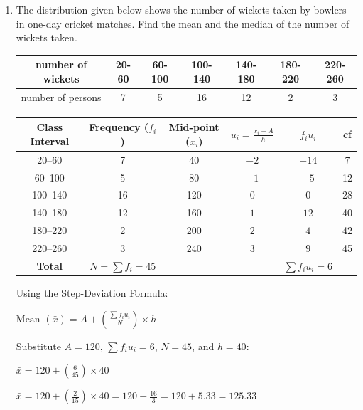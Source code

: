 \begin{enumerate}[label=\thesubsection.\arabic*, ref=\thesubsection.\theenumi]
	$Y(x)= x^2-4x+8  \implies R(x)= 10x-33$
	
	$P(x)- R(x)= 2x^3-3x^2 -4x+40  $ is divisible by $ x^2-4x+8$

	
	\item The distribution given below shows the number of wickets taken by bowlers in one-day cricket matches. Find the mean and the median of the number of wickets taken.
	
		\begin{tabular}{c|c|c|c|c|c|c}
		
		\hline
		number of wickets & 20-60 & 60-100 & 100-140 & 140-180 & 180-220 & 220-260 \\ 
		\hline 
		
		number of persons & 7 & 5&16&12&2 &3\\ \hline  
		
		
	\end{tabular}
	
	
	\solution
	
	\begin{center}
		\begin{tabular}{cccccc}
			\hline
			\textbf{Class Interval} & \textbf{Frequency ($f_i$)} & \textbf{Mid-point ($x_i$)} & $u_i = \frac{x_i - A}{h}$ & $f_i u_i$  & cf \\
			\hline
			20--60   & 7  & 40  & $-2$ & $-14$ & 7 \\
			60--100  & 5  & 80  & $-1$ & $-5$ &12 \\
			100--140 & 16 & 120 & $0$  & $0$   & 28\\
			140--180 & 12 & 160 & $1$  & $12$   & 40\\
			180--220 & 2  & 200 & $2$  & $4$   & 42 \\
			220--260 & 3  & 240 & $3$  & $9$  & 45 \\
			\hline
			\textbf{Total} & $N = \sum f_i = 45$ & & & $\sum f_i u_i = 6$  & \\
			\hline
		\end{tabular}
	\end{center}
	
	
	
	Using the Step-Deviation Formula:
	\begin{center}
	$\text{Mean } (\bar{x}) = A + \left( \frac{\sum f_i u_i}{N} \right) \times h$
	\end{center}
	
	Substitute $A = 120$, $\sum f_i u_i = 6$, $N = 45$, and $h = 40$:
	\begin{center}
	$\bar{x} = 120 + \left( \frac{6}{45} \right) \times 40$
	\end{center}
	\begin{center}
	$\bar{x} = 120 + \left( \frac{2}{15} \right) \times 40 = 120 + \frac{16}{3} = 120 + 5.33 = 125.33$
	\end{center}
	

\end{enumerate}
